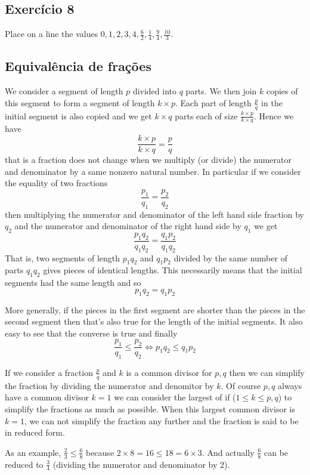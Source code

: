 \subsection*{Exercício 8}

Place on a line the values $0,1,2,3,4,\frac{6}{2},\frac{1}{4},\frac{9}{4},
\frac{10}{3}$.

\subsection*{Equivalência de frações}

We consider a segment of length $p$ divided into $q$ parts. We then join
$k$ copies of this segment to form a segment of length $k \times p$. Each
part of length $\frac{p}{q}$ in the initial segment is also copied and we get
$k \times q$ parts each of size $\frac{k \times p}{k \times q}$. Hence we have
$$
\frac{k \times p}{k \times q} = \frac{p}{q}
$$
that is a fraction does not change when we multiply (or divide) the numerator
and denominator by a same nonzero natural number. In particular if we consider
the equality of two fractions
$$
\frac{p_1}{q_1} = \frac{p_2}{q_2}
$$
then multiplying the numerator and denominator of the left hand side fraction
by $q_2$ and the numerator and denominator of the right hand side by $q_1$ we
get
$$
\frac{p_1 q_2}{q_1 q_2} = \frac{q_1p_2}{q_1q_2}
$$
That is, two segments of length $p_1q_2$ and
$q_1p_2$ divided by the same number of parts $q_1q_2$ gives pieces of identical
lengths. This necessarily means that the initial segments had the same length
and so
$$p_1q_2 = q_1p_2$$

More generally, if the pieces in the first segment are shorter than the
pieces in the second segment then that's also true for the length of the
initial segments. It also easy to see that the converse is true and finally
$$
\frac{p_1}{q_1} \leq \frac{p_2}{q_2} \Leftrightarrow
p_1q_2 \leq q_1p_2
$$

If we consider a fraction $\frac{p}{q}$ and $k$ is a common divisor for
$p,q$ then we can simplify the fraction by dividing the numerator and denomitor
by $k$. Of course $p,q$ always have a common divisor $k=1$ we can consider
the largest of if ($1 \leq k \leq p,q$)
to simplify the fractions as much as possible. When this largest common divisor
is $k=1$, we can not simplify the fraction any further and the fraction is
said to be in reduced form.

As an example, $\frac{2}{3} \leq \frac{6}{8}$ because
$2 \times 8 = 16 \leq 18 = 6 \times 3$. And actually
$\frac{6}{8}$ can be reduced to $\frac{3}{4}$ (dividing the numerator and
denominator by $2$).

